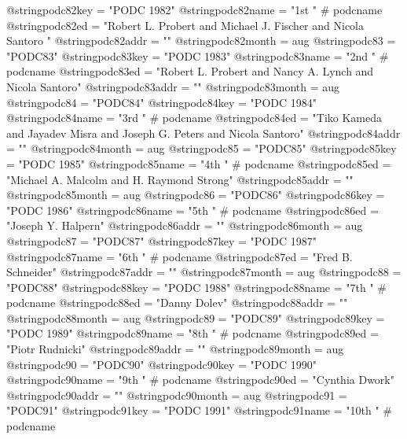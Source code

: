 @string{podc82key =             "PODC 1982"}
@string{podc82name =            "1st " # podcname}
@string{podc82ed =              "Robert L. Probert and Michael J. Fischer and Nicola Santoro "}
@string{podc82addr =            ""}
@string{podc82month =           aug}
@string{podc83 =                "PODC83"}
@string{podc83key =             "PODC 1983"}
@string{podc83name =            "2nd " # podcname}
@string{podc83ed =              "Robert L. Probert and Nancy A. Lynch and Nicola Santoro"}
@string{podc83addr =            ""}
@string{podc83month =           aug}
@string{podc84 =                "PODC84"}
@string{podc84key =             "PODC 1984"}
@string{podc84name =            "3rd " # podcname}
@string{podc84ed =              "Tiko Kameda and Jayadev Misra and Joseph G. Peters and Nicola Santoro"}
@string{podc84addr =            ""}
@string{podc84month =           aug}
@string{podc85 =                "PODC85"}
@string{podc85key =             "PODC 1985"}
@string{podc85name =            "4th " # podcname}
@string{podc85ed =              "Michael A. Malcolm and H. Raymond Strong"}
@string{podc85addr =            ""}
@string{podc85month =           aug}
@string{podc86 =                "PODC86"}
@string{podc86key =             "PODC 1986"}
@string{podc86name =            "5th " # podcname}
@string{podc86ed =              "Joseph Y. Halpern"}
@string{podc86addr =            ""}
@string{podc86month =           aug}
@string{podc87 =                "PODC87"}
@string{podc87key =             "PODC 1987"}
@string{podc87name =            "6th " # podcname}
@string{podc87ed =              "Fred B. Schneider"}
@string{podc87addr =            ""}
@string{podc87month =           aug}
@string{podc88 =                "PODC88"}
@string{podc88key =             "PODC 1988"}
@string{podc88name =            "7th " # podcname}
@string{podc88ed =              "Danny Dolev"}
@string{podc88addr =            ""}
@string{podc88month =           aug}
@string{podc89 =                "PODC89"}
@string{podc89key =             "PODC 1989"}
@string{podc89name =            "8th " # podcname}
@string{podc89ed =              "Piotr Rudnicki"}
@string{podc89addr =            ""}
@string{podc89month =           aug}
@string{podc90 =                "PODC90"}
@string{podc90key =             "PODC 1990"}
@string{podc90name =            "9th " # podcname}
@string{podc90ed =              "Cynthia Dwork"}
@string{podc90addr =            ""}
@string{podc90month =           aug}
@string{podc91 =                "PODC91"}
@string{podc91key =             "PODC 1991"}
@string{podc91name =            "10th " # podcname}
